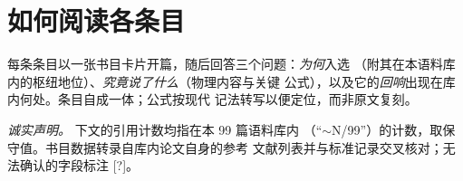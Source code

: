 \section*{如何阅读各条目}

每条条目以一张书目卡片开篇，随后回答三个问题：\emph{为何}入选
（附其在本语料库内的枢纽地位）、\emph{究竟说了什么}（物理内容与关键
公式），以及它的\emph{回响}出现在库内何处。条目自成一体；公式按现代
记法转写以便定位，而非原文复刻。

\bigskip
\noindent\emph{诚实声明。} 下文的引用计数均指在本 99 篇语料库内
（``$\sim$N/99''）的计数，取保守值。书目数据转录自库内论文自身的参考
文献列表并与标准记录交叉核对；无法确认的字段标注 [?]。
